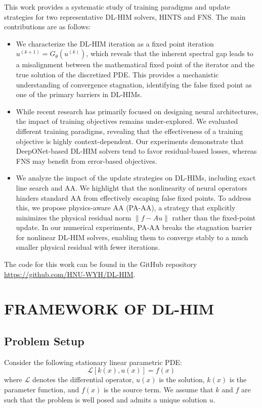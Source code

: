 \documentclass[11pt]{article}
\begin{document}
This work provides a systematic study of training paradigms and update strategies for two representative DL-HIM solvers, HINTS and FNS. The main contributions are as follows:
\begin{itemize}
    \item We characterize the DL-HIM iteration as a fixed point iteration $u^{(k+1)}=G_\theta(u^{(k)})$, which reveals that the inherent spectral gap leads to a misalignment between the mathematical fixed point of the iterator and the true solution of the discretized PDE. This provides a mechanistic understanding of convergence stagnation, identifying the false fixed point as one of the primary barriers in DL-HIMs.

    \item While recent research has primarily focused on designing neural architectures, the impact of training objectives remains under-explored. We evaluated different training paradigms, revealing that the effectiveness of a training objective is highly context-dependent. Our experiments demonstrate that DeepONet-based DL-HIM solvers tend to favor residual-based losses, whereas FNS may benefit from error-based objectives.

    \item We analyze the impact of the update strategies on DL-HIMs, including exact line search and AA. We highlight that the nonlinearity of neural operators hinders standard AA from effectively escaping false fixed points. To address this, we propose physics-aware AA (PA-AA), a strategy that explicitly minimizes the physical residual norm $\|f-Au\|$ rather than the fixed-point update. In our numerical experiments, PA-AA breaks the stagnation barrier for nonlinear DL-HIM solvers, enabling them to converge stably to a much smaller physical residual with fewer iterations.

\end{itemize}

The code for this work can be found in the GitHub repository \url{https://github.com/HNU-WYH/DL-HIM}.

\section{FRAMEWORK OF DL-HIM}\label{sec:framework}
\subsection{Problem Setup}
Consider the following stationary linear parametric PDE:
\begin{equation}
    \mathcal{L}\left[k(x), u(x)\right] = f(x)
    \label{eq:PDE}
\end{equation}
where $\mathcal L$ denotes the differential operator, $u(x)$ is the solution, $k(x)$ is the parameter function, and $f(x)$ is the source term. We assume that $k$ and $f$ are such that the problem is well posed and admits a unique solution $u$.
\end{document}
